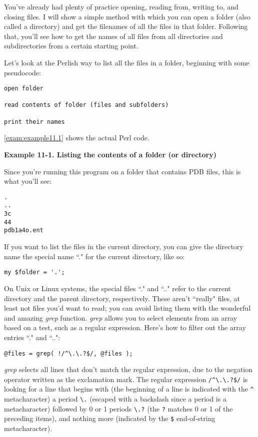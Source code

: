 You've already had plenty of practice opening, reading from, writing to, and closing files. I will show a simple method with which you can open a folder (also called a directory) and get the filenames of all the files in that folder. Following that, you'll see how to get the names of all files from all directories and subdirectories from a certain starting point.

Let's look at the Perlish way to list all the files in a folder, beginning with some pseudocode: 

\begin{lstlisting}
open folder

read contents of folder (files and subfolders)

print their names
\end{lstlisting}

\autoref{exam:example11.1} shows the actual Perl code.

\textbf{Example 11-1. Listing the contents of a folder (or directory)}


Since you're running this program on a folder that contains PDB files, this is what you'll see: 

\begin{lstlisting}
.
..
3c
44
pdb1a4o.ent
\end{lstlisting}

If you want to list the files in the current directory, you can give the directory name the special name ``." for the current directory, like so:

\begin{lstlisting}
my $folder = '.';
\end{lstlisting}

On Unix or Linux systems, the special files ``." and ``.." refer to the current directory and the parent directory, respectively. These aren't ``really" files, at least not files you'd want to read; you can avoid listing them with the wonderful and amazing \textit{grep} function.  \textit{grep} allows you to select elements from an array based on a test, such as a regular expression. Here's how to filter out the array entries ``." and ``..": 

\begin{lstlisting}
@files = grep( !/^\.\.?$/, @files );
\end{lstlisting}

\textit{grep} selects all lines that don't match the regular expression, due to the negation operator written as the exclamation mark. The regular expression \verb|/^\.\.?$/| is looking for a line that begins with (the beginning of a line is indicated with the \verb|^| metacharacter) a period \verb|\.| (escaped with a backslash since a period is a metacharacter) followed by 0 or 1 periods \verb|\.?| (the \verb|?| matches 0 or 1 of the preceding items), and nothing more (indicated by the \verb|$| end-of-string metacharacter).

